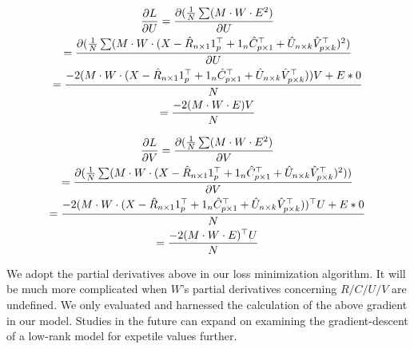 \documentclass{article}
\begin{document}
\begin{gather*}
    \pdv{L}{U} = \pdv{(\frac{1}{N}\sum(M \cdot W \cdot E^2)}{U} \\
    = \pdv{(\frac{1}{N}\sum(M \cdot W \cdot (X - \hat{R}_{n \times 1}1^{\top}_{p} + 1_{n}\hat{C}_{p \times 1}^{\top} + \hat{U}_{n \times k}\hat{V}^{\top}_{p \times k})^2)}{U}\\
    = \frac{-2(M \cdot W \cdot (X - \hat{R}_{n \times 1}1^{\top}_{p} + 1_{n}\hat{C}_{p \times 1}^{\top} + \hat{U}_{n \times k}\hat{V}^{\top}_{p \times k}))V + E * 0}{N}\\
    = \frac{-2(M \cdot W \cdot E)V }{N}
\end{gather*}

\begin{gather*}
    \pdv{L}{V} = \pdv{(\frac{1}{N}\sum(M \cdot W \cdot E^2)}{V} \\
    = \pdv{(\frac{1}{N}\sum(M \cdot W \cdot (X - \hat{R}_{n \times 1}1^{\top}_{p} + 1_{n}\hat{C}_{p \times 1}^{\top} + \hat{U}_{n \times k}\hat{V}^{\top}_{p \times k})^2))}{V}\\
    = \frac{-2(M \cdot W \cdot (X - \hat{R}_{n \times 1}1^{\top}_{p} + 1_{n}\hat{C}_{p \times 1}^{\top} + \hat{U}_{n \times k}\hat{V}^{\top}_{p \times k}))^\top U + E*0}{N}\\
    = \frac{-2(M \cdot W \cdot E)^\top U}{N}
\end{gather*}

We adopt the partial derivatives above in our loss minimization algorithm. It will be much more complicated when $W$'s partial derivatives concerning $R/C/U/V$ are undefined. We only evaluated and harnessed the calculation of the above gradient in our model. Studies in the future can expand on examining the gradient-descent of a low-rank model for expetile values further. 
\end{document}
